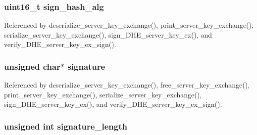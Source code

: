 \subsubsection[{\texorpdfstring{sign\+\_\+hash\+\_\+alg}{sign_hash_alg}}]{\setlength{\rightskip}{0pt plus 5cm}uint16\+\_\+t sign\+\_\+hash\+\_\+alg}\hypertarget{structdhe__server__key__exchange__t_a07ea01aadbb81f38a9a27e324d11f54e}{}\label{structdhe__server__key__exchange__t_a07ea01aadbb81f38a9a27e324d11f54e}


Referenced by deserialize\+\_\+server\+\_\+key\+\_\+exchange(), print\+\_\+server\+\_\+key\+\_\+exchange(), serialize\+\_\+server\+\_\+key\+\_\+exchange(), sign\+\_\+\+D\+H\+E\+\_\+server\+\_\+key\+\_\+ex(), and verify\+\_\+\+D\+H\+E\+\_\+server\+\_\+key\+\_\+ex\+\_\+sign().

\subsubsection[{\texorpdfstring{signature}{signature}}]{\setlength{\rightskip}{0pt plus 5cm}unsigned char$\ast$ signature}\hypertarget{structdhe__server__key__exchange__t_a775505f2a74638cda44fdd79c4e07993}{}\label{structdhe__server__key__exchange__t_a775505f2a74638cda44fdd79c4e07993}


Referenced by deserialize\+\_\+server\+\_\+key\+\_\+exchange(), free\+\_\+server\+\_\+key\+\_\+exchange(), print\+\_\+server\+\_\+key\+\_\+exchange(), serialize\+\_\+server\+\_\+key\+\_\+exchange(), sign\+\_\+\+D\+H\+E\+\_\+server\+\_\+key\+\_\+ex(), and verify\+\_\+\+D\+H\+E\+\_\+server\+\_\+key\+\_\+ex\+\_\+sign().

\subsubsection[{\texorpdfstring{signature\+\_\+length}{signature_length}}]{\setlength{\rightskip}{0pt plus 5cm}unsigned int signature\+\_\+length}\hypertarget{structdhe__server__key__exchange__t_a23a683d5129246d9adbd0029612d06a8}{}\label{structdhe__server__key__exchange__t_a23a683d5129246d9adbd0029612d06a8}


